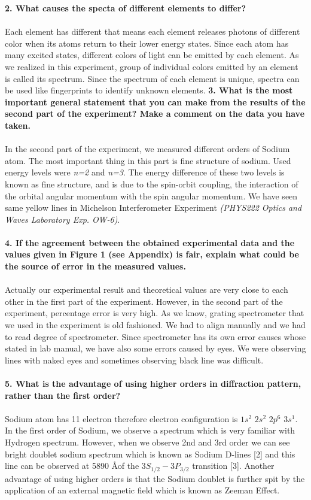 \documentclass[a4paper,12pt]{article}
\begin{document}
\textbf{2. What causes the specta of different elements to differ?}\\\\
Each element has different that means each element releases photons of different color when its atoms return to their lower energy states. Since each atom has many excited states, different colors of light can be emitted by each element. As we realized in this experiment, group of individual colors emitted by an element is called its spectrum. Since the spectrum of each element is unique, spectra can be used like fingerprints to identify unknown elements.
\newpage
\textbf{3. What is the most important general statement that you can make from the results of the second part of the experiment? Make a comment on the data you have taken.}\\\\
In the second part of the experiment, we measured different orders of Sodium atom. The most important thing in this part is fine structure of sodium. Used energy levels were \textit{n=2} and \textit{n=3}. The
energy difference of these two levels is known as fine structure, and is
due to the spin-orbit coupling, the interaction of the orbital angular momentum
with the spin angular momentum. We have seen same yellow lines in Michelson Interferometer Experiment \textit{(PHYS222 Optics and Waves Laboratory Exp. OW-6)}.\\\\
\textbf{4. If the agreement between the obtained experimental data and the values given in Figure 1 (see Appendix) is fair, explain what could be the source of error in the measured values.}\\\\
Actually our experimental result and theoretical values are very close to each other in the first part of the experiment. However, in the second part of the experiment, percentage error is very high. As we know, grating spectrometer that we used in the experiment is old fashioned. We had to align manually and we had to read degree of spectrometer. Since spectrometer has its own error causes whose stated in lab manual, we have also some errors caused by eyes. We were observing lines with naked eyes and sometimes observing black line was difficult.\\\\
\textbf{5. What is the advantage of using higher orders in diffraction pattern, rather than the first order?}\\\\
Sodium atom has 11 electron therefore electron configuration is $1s^{2}$ $2s^{2}$ $2p^{6}$ $3s^{1}$. In the first order of Sodium, we observe a spectrum which is very familiar with Hydrogen spectrum. However, when we observe 2nd and 3rd order we can see bright doublet sodium spectrum which is known as Sodium D-lines [2] and this line can be observed at 5890 \AA  of the $3S_{1/2}-3P_{3/2}$ transition [3]. Another advantage of using higher orders is that the Sodium doublet is further spit by the application of an external magnetic field which is known as Zeeman Effect.\\\\
\end{document}
